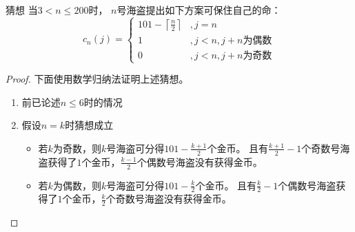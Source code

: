 \begin{questions}
\begin{solution}
        \textsf{猜想} \quad 当$3 < n \leq 200$时， $n$号海盗提出如下方案可保住自己的命：$$
            c_n(j) = \begin{cases}
                101-\left\lceil \frac{n}{2} \right\rceil & , j=n                     \\
                1                                        & , j<n , j+n \text{为偶数} \\
                0                                        & , j<n , j+n \text{为奇数}
            \end{cases}
        $$

        \begin{proof}
            下面使用数学归纳法证明上述猜想。
            \begin{enumerate}
                \item 前已论述$n \leq 6$时的情况
                \item {
                      假设$n=k$时猜想成立
                      \begin{itemize}
                          \item {
                                若$k$为奇数，则$k$号海盗可分得$101-\frac{k+1}{2}$个金币。
                                且有$\frac{k+1}{2}-1$个奇数号海盗获得了$1$个金币，$\frac{k-1}{2}$个偶数号海盗没有获得金币。
                                }
                          \item {
                                若$k$为偶数，则$k$号海盗可分得$101-\frac{k}{2}$个金币。
                                且有$\frac{k}{2}-1$个偶数号海盗获得了$1$个金币，$\frac{k}{2}$个奇数号海盗没有获得金币。
                                }
                      \end{itemize}

}
\end{enumerate}
\end{proof}
\end{solution}
\end{questions}
